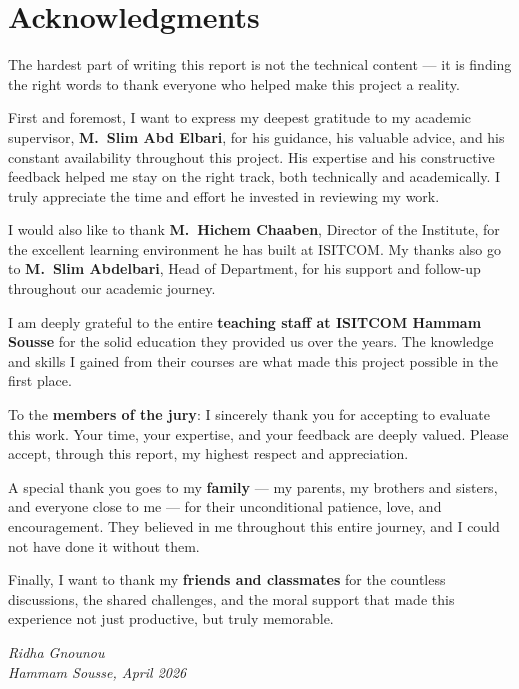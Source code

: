 
\chapter*{Acknowledgments}

The hardest part of writing this report is not the technical content --- it is finding the right words to thank everyone who helped make this project a reality.

First and foremost, I want to express my deepest gratitude to my academic supervisor, \textbf{M.~Slim Abd Elbari}, for his guidance, his valuable advice, and his constant availability throughout this project. His expertise and his constructive feedback helped me stay on the right track, both technically and academically. I truly appreciate the time and effort he invested in reviewing my work.

I would also like to thank \textbf{M.~Hichem Chaaben}, Director of the Institute, for the excellent learning environment he has built at ISITCOM. My thanks also go to \textbf{M.~Slim Abdelbari}, Head of Department, for his support and follow-up throughout our academic journey.

I am deeply grateful to the entire \textbf{teaching staff at ISITCOM Hammam Sousse} for the solid education they provided us over the years. The knowledge and skills I gained from their courses are what made this project possible in the first place.

To the \textbf{members of the jury}: I sincerely thank you for accepting to evaluate this work. Your time, your expertise, and your feedback are deeply valued. Please accept, through this report, my highest respect and appreciation.

A special thank you goes to my \textbf{family} --- my parents, my brothers and sisters, and everyone close to me --- for their unconditional patience, love, and encouragement. They believed in me throughout this entire journey, and I could not have done it without them.

Finally, I want to thank my \textbf{friends and classmates} for the countless discussions, the shared challenges, and the moral support that made this experience not just productive, but truly memorable.

\vspace{1cm}
\begin{flushright}
\textit{Ridha Gnounou}\\
\textit{Hammam Sousse, April 2026}
\end{flushright}
